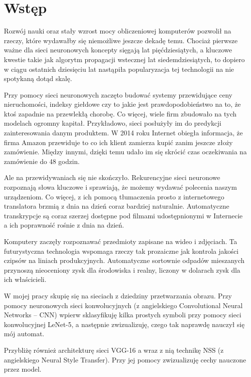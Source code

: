 \chapter{Wstęp}
\label{cha:wstep}

Rozwój nauki oraz stały wzrost mocy obliczeniowej komputerów pozwolił na rzeczy, które wydawałby się niemożliwe jeszcze dekadę temu. Chociaż pierwsze ważne dla sieci neuronowych koncepty sięgają lat pięćdziesiątych, a kluczowe kwestie takie jak algorytm propagacji wstecznej lat siedemdziesiątych, to dopiero w ciągu ostatnich dziesięciu lat nastąpiła popularyzacja tej technologii na nie spotykaną dotąd skalę.

Przy pomocy sieci neuronowych zaczęto budować systemy przewidujące ceny nieruchomości, indeksy giełdowe czy to jakie jest prawdopodobieństwo na to, że ktoś zapadnie na przewlekłą chorobę. Co więcej, wiele firm zbudowało na tych modelach ogromny kapitał. Przykładowo, sieci posłużyły im do predykcji zainteresowania danym produktem. W 2014 roku Internet obiegła informacja, że firma Amazon przewiduje to co ich klient zamierza kupić zanim jeszcze złoży zamówienie. Między innymi, dzięki temu udało im się skrócić czas oczekiwania na zamówienie do 48 godzin.

Ale na przewidywaniach się nie skończyło. Rekurencyjne sieci neuronowe rozpoznają słowa kluczowe i sprawiają, że możemy wydawać polecenia naszym urządzeniom. Co więcej, z ich pomocą tłumaczenia prosto z internetowego translatora brzmią z dnia na dzień coraz bardziej naturalnie. Automatyczne transkrypcje są coraz szerzej dostępne pod filmami udostępnionymi w Internecie a ich poprawność rośnie z dnia na dzień.

Komputery zaczęły rozpoznawać przedmioty zapisane na wideo i zdjęciach.  Ta futurystyczna technologia wspomaga rzeczy tak prozaiczne jak kontrola jakości czipsów na liniach produkcyjnych. Automatyczne sortownie odpadów mieszanych przynoszą nieoceniony zysk dla środowiska i realny, liczony w dolarach zysk dla ich właścicieli. 

W mojej pracy skupię się na sieciach z dziedziny przetwarzania obrazu. Przy pomocy neuronowych sieci konwolucyjnych (z angielskiego Convolutional Neural Networks – CNN) wpierw sklasyfikuję kilka prostych symboli przy pomocy sieci konwolucyjnej LeNet-5, a następnie zwizualizuję, czego tak naprawdę nauczył się mój automat.

Przybliżę również architekturę sieci VGG-16 a wraz z nią technikę NSS (z angielskiego Neural Style Transfer). Przy jej pomocy zwizualizuję cechy nauczone przez model.
